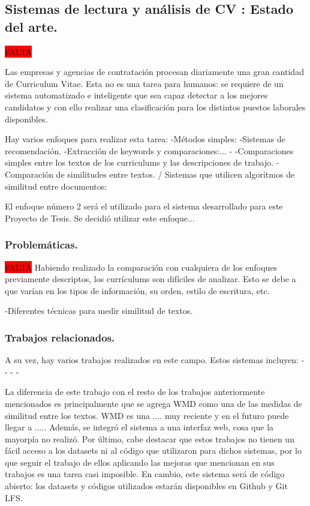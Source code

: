 \documentclass[12pt,a4paper]{article}
\begin{document}
\subsection{Sistemas de lectura y análisis de CV : Estado del arte.}
\colorbox{red}{FALTA}

Las empresas y agencias de contratación procesan diariamente una gran cantidad de Curriculum Vitae. Esta no es una tarea para humanos: se requiere de un sistema automatizado e inteligente que sea capaz detectar a los mejores candidatos y con ello realizar una clasificación para los distintos puestos laborales disponibles.

Hay varios enfoques para realizar esta tarea:
	-Métodos simples: 
	-Sistemas de recomendación.
    -Extracción de keywords y comparaciones:...
    -
    -Comparaciones simples entre los textos de los curriculums y las descripciones de trabajo.
    -Comparación de similitudes entre textos. / Sistemas que utilicen algoritmos de similitud entre documentos:
    
El enfoque número 2 será el utilizado para el sistema desarrollado para este Proyecto de Tesis.
Se decidió utilizar este enfoque...

\subsubsection{Problemáticas.}
\colorbox{red}{FALTA}
Habiendo realizado la comparación con cualquiera de los enfoques previamente descriptos, los currículums son difíciles de analizar. Esto se debe a que varían en los tipos de información, su orden, estilo de escritura, etc.

-Diferentes técnicas para medir similitud de textos. 

\subsubsection{Trabajos relacionados.}

A su vez, hay varios trabajos realizados en este campo. Estos sistemas incluyen:
-
-
-
-

La diferencia de este trabajo con el resto de los trabajos anteriormente mencionados es principalmente que se agrega WMD como una de las medidas de similitud entre los textos. WMD es una .... muy reciente y en el futuro puede llegar a .....
Además, se integró el sistema a una interfaz web, cosa que la mayorpía no realizó.
Por último, cabe destacar que estos trabajos no tienen un fácil acceso a los datasets ni al código que utilizaron para dichos sistemas, por lo que seguir el trabajo de ellos aplicando las mejoras que mencionan en sus trabajos es una tarea casi imposible. En cambio, este sistema será de código abierto:  los datasets y códigos utilizados estarán disponibles en Github y Git LFS.
\end{document}
